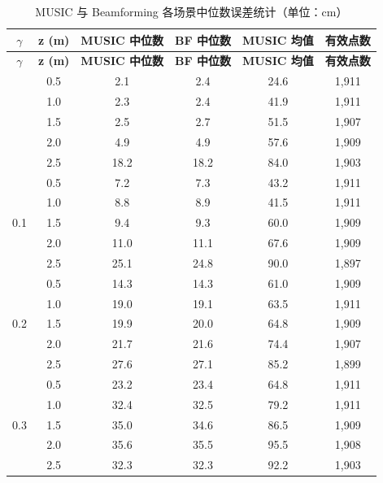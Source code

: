 \documentclass[12pt,a4paper]{ctexart}
\begin{document}
\begin{longtable}{cccccc}
\caption{MUSIC 与 Beamforming 各场景中位数误差统计（单位：cm）}\\
\toprule
\textbf{$\gamma$} & \textbf{z (m)} & \textbf{MUSIC 中位数} & \textbf{BF 中位数} & \textbf{MUSIC 均值} & \textbf{有效点数} \\
\midrule
\endfirsthead
\toprule
\textbf{$\gamma$} & \textbf{z (m)} & \textbf{MUSIC 中位数} & \textbf{BF 中位数} & \textbf{MUSIC 均值} & \textbf{有效点数} \\
\midrule
\endhead
\bottomrule
\endfoot
\multirow{5}{*}{0.0} & 0.5 & 2.1 & 2.4 & 24.6 & 1,911 \\
                      & 1.0 & 2.3 & 2.4 & 41.9 & 1,911 \\
                      & 1.5 & 2.5 & 2.7 & 51.5 & 1,907 \\
                      & 2.0 & 4.9 & 4.9 & 57.6 & 1,909 \\
                      & 2.5 & 18.2 & 18.2 & 84.0 & 1,903 \\
\midrule
\multirow{5}{*}{0.1} & 0.5 & 7.2 & 7.3 & 43.2 & 1,911 \\
                      & 1.0 & 8.8 & 8.9 & 41.5 & 1,911 \\
                      & 1.5 & 9.4 & 9.3 & 60.0 & 1,909 \\
                      & 2.0 & 11.0 & 11.1 & 67.6 & 1,909 \\
                      & 2.5 & 25.1 & 24.8 & 90.0 & 1,897 \\
\midrule
\multirow{5}{*}{0.2} & 0.5 & 14.3 & 14.3 & 61.0 & 1,909 \\
                      & 1.0 & 19.0 & 19.1 & 63.5 & 1,911 \\
                      & 1.5 & 19.9 & 20.0 & 64.8 & 1,909 \\
                      & 2.0 & 21.7 & 21.6 & 74.4 & 1,907 \\
                      & 2.5 & 27.6 & 27.1 & 85.2 & 1,899 \\
\midrule
\multirow{5}{*}{0.3} & 0.5 & 23.2 & 23.4 & 64.8 & 1,911 \\
                      & 1.0 & 32.4 & 32.5 & 79.2 & 1,911 \\
                      & 1.5 & 35.0 & 34.6 & 86.5 & 1,909 \\
                      & 2.0 & 35.6 & 35.5 & 95.5 & 1,908 \\
                      & 2.5 & 32.3 & 32.3 & 92.2 & 1,903 \\
\bottomrule
\end{longtable}
\end{document}
